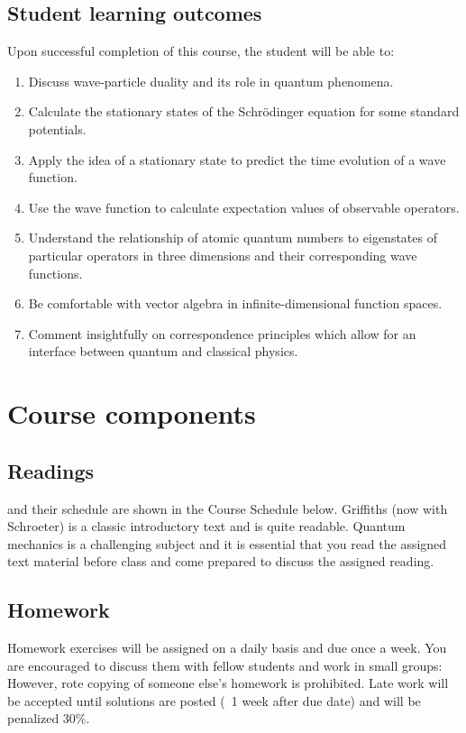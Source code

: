 \documentclass{syllabus}
\begin{document}
\subsection*{Student learning outcomes} 
Upon successful completion of this course, the student will be able to:
\begin{enumerate}[label=\textcolor{CarthageDark}{\bfseries\arabic*.}]
\item Discuss wave-particle duality and its role in quantum phenomena.
\item Calculate the stationary states of the Schrödinger equation for some standard potentials.
\item Apply the idea of a stationary state to predict the time evolution of a wave function.
\item Use the wave function to calculate expectation values of observable operators.
\item Understand the relationship of atomic quantum numbers to eigenstates of particular operators in three dimensions and their corresponding wave functions.
\item Be comfortable with vector algebra in infinite-dimensional function spaces.
\item Comment insightfully on correspondence principles which allow for an interface between quantum and classical physics.
\end{enumerate}

\section*{Course components}

\subsection*{Readings}
and their schedule are shown in the Course Schedule below. Griffiths (now with Schroeter) is a classic introductory text and is quite readable. Quantum mechanics is a challenging subject and it is essential that you read the assigned text material before class and come prepared to discuss the assigned reading.

\subsection{Homework} 
Homework exercises will be assigned on a daily basis and due once a week. You are encouraged to discuss them with fellow students and work in small groups: However, rote copying of someone else’s homework is prohibited. Late work will be accepted until solutions are posted (~1 week after due date) and will be penalized 30\%. 
\end{document}
